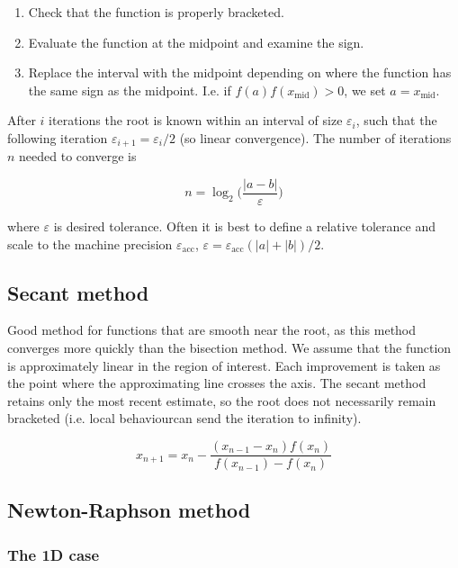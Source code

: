 \documentclass[a4paper]{article}
\begin{document}
\begin{enumerate}
    \item Check that the function is properly bracketed.
    \item Evaluate the function at the midpoint and examine the sign.
    \item Replace the interval with the midpoint depending on where the function has the same sign as the midpoint. I.e. if $f(a)f(x_{\text{mid}})>0$, we set $a=x_{\text{mid}}$.
\end{enumerate}

After $i$ iterations the root is known within an interval of size $\varepsilon_i$, such that the following iteration $\varepsilon_{i+1}=\varepsilon_i/2$ (so linear convergence). The number of iterations $n$ needed to converge is 

\begin{equation*}
    n=\log_2\bigg(\frac{|a-b|}{\varepsilon}\bigg)
\end{equation*}

where $\varepsilon$ is desired tolerance. Often it is best to define a relative tolerance and scale to the machine precision $\varepsilon_{\text{acc}}$, $\varepsilon=\varepsilon_{\text{acc}}(|a|+|b|)/2$.

\subsection{Secant method}

Good method for functions that are smooth near the root, as this method converges more quickly than the bisection method. We assume that the function is approximately linear in the region of interest. Each improvement is taken as the point where the approximating line crosses the axis. The secant method retains only the most recent estimate, so the root does not necessarily remain bracketed (i.e. local behaviourcan send the iteration to infinity).

\begin{equation*}
    x_{n+1}=x_n-\frac{(x_{n-1}-x_n)f(x_n)}{f(x_{n-1})-f(x_n)}
\end{equation*}

\subsection{Newton-Raphson method}

\subsubsection{The 1D case}
\end{document}
